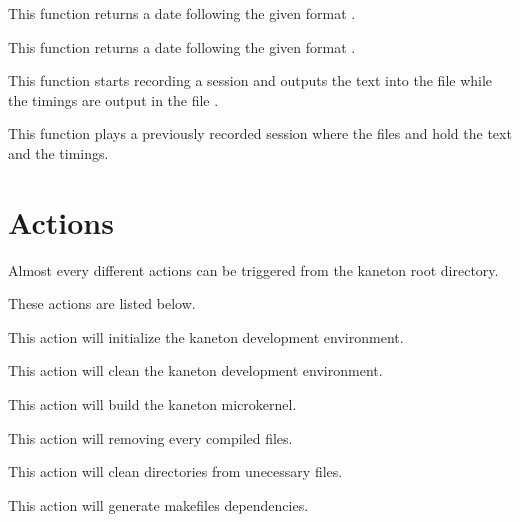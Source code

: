          {
	   This function returns a date following the given format
	   .
	 }

         {
	   This function returns a date following the given format
	   .
	 }

         {
	   This function starts recording a session and outputs
	   the text into the file  while the timings
	   are output in the file .
	 }

         {
	   This function plays a previously recorded session where
	   the files  and  hold the
	   text and the timings.
	 }

%
%

\section{Actions}

Almost every different actions can be triggered from the kaneton
root directory.

These actions are listed below.

        {
	  This action will initialize the kaneton development environment.

	}

	{
	  This action will clean the kaneton development environment.

	}

	{
	  This action will build the kaneton microkernel.

	}

	{
	  This action will removing every compiled files.

	}

	{
	  This action will clean directories from unecessary files.

	}

	{
	  This action will generate makefiles dependencies.

	}

